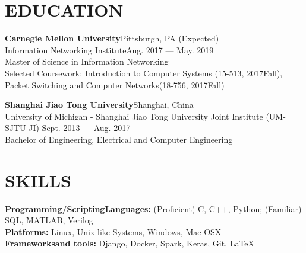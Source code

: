 \documentclass[margin,line,letterpaper]{res}
\begin{document}
\address{ $\bullet$ linkedin.com/in/hao-wu-710254128 $\bullet$ wu.hao.cz.21@gmail.com $\bullet$ (412)-616-6280}
\vspace{-.1 in}
\begin{resume}

\section{EDUCATION}
{
\small
\textbf{Carnegie Mellon University}\hfill Pittsburgh, PA (Expected) \\ Information Networking Institute\hfill Aug. 2017 --- May. 2019\\
Master of Science in Information Networking\\
{\small Selected Coursework: Introduction to Computer Systems (15-513, 2017Fall), Packet Switching and Computer Networks(18-756, 2017Fall)} 
}
\vspace{-.1 in}

{
\small
\textbf{Shanghai Jiao Tong University}\hfill Shanghai, China \\
University of Michigan - Shanghai Jiao Tong University Joint Institute (UM-SJTU JI) \hfill Sept. 2013 --- Aug. 2017\\
Bachelor of Engineering, Electrical and Computer Engineering
}
\vspace{-.05 in}
\section{SKILLS}
{\small \textbf{Programming/ScriptingLanguages:} (Proficient) C, C++, Python; (Familiar) SQL, MATLAB, Verilog}\\
{\small \textbf{Platforms:} Linux, Unix-like Systems, Windows, Mac OSX}\\
{\small \textbf{Frameworksand tools:} Django, Docker, Spark, Keras, Git, \LaTeX}
\vspace{-.05 in}

\end{resume}
\end{document}
